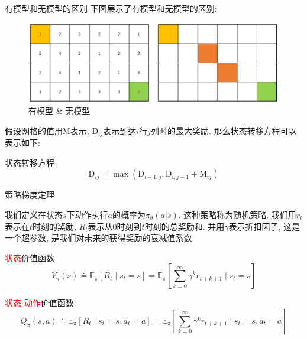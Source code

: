 \documentclass{beamer}
\begin{document}
\begin{frame}{有模型和无模型的区别}
    \footnotesize
    下图展示了有模型和无模型的区别:
    \begin{figure}
        \centering
        \includegraphics[scale=0.35]{pic/dprl.pdf}
        \caption{有模型 \& 无模型}
    \end{figure}
    假设网格的值用$\mathrm{M}$表示, $\mathrm{D}_{ij}$表示到达$i$行$j$列时的最大奖励. 那么状态转移方程可以表示如下:
    \begin{block}{状态转移方程}
        \begin{equation}
            \mathrm{D}_{ij}=\max \left( \mathrm{D}_{i-1,j}, \mathrm{D}_{i,j-1}+\mathrm{M}_{ij} \right) 
        \end{equation}
    \end{block}
\end{frame}

\begin{frame}{策略梯度定理}
    \footnotesize
    \begin{define}[{策略与奖励}]
        我们定义在状态$s$下动作执行$a$的概率为$\pi_\theta(a|s)$. 这种策略称为随机策略. 我们用$r_t$表示在$t$时刻的奖励, $R_t$表示从$0$时刻到$t$时刻的总奖励和. 并用$\gamma$表示折扣因子, 这是一个超参数, 是我们对未来的获得奖励的衰减值系数.
    \end{define}
    
    \begin{define}[{价值函数}]
        \begin{textbox}{{\footnotesize\textcolor{red}{状态}价值函数}}
            \begin{equation}
                V_{\pi}(s) \doteq \mathbb{E}_{\pi}\left[R_{t} \mid s_{t}=s\right]=\mathbb{E}_{\pi}\left[\sum_{k=0}^{\infty} \gamma^{k} r_{t+k+1} \mid s_{t}=s\right]
            \end{equation}
        \end{textbox}
        \begin{textbox}{\footnotesize\textcolor{red}{状态-动作}价值函数}
            \begin{equation}
                Q_{\pi}(s, a) \doteq \mathbb{E}_{\pi}\left[R_{t} \mid s_{t}=s, a_{t}=a\right]=\mathbb{E}_{\pi}\left[\sum_{k=0}^{\infty} \gamma^{k} r_{t+k+1} \mid s_{t}=s, a_{t}=a\right]
            \end{equation}
        \end{textbox}
    \end{define}
    
\end{frame}
\end{document}
